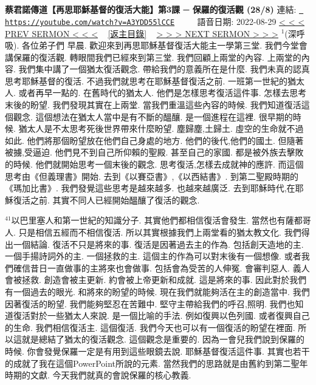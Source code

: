 \documentclass{book}
\begin{document}
\section{}
\label{sec:A3YDD55lCCE}
\textbf{蔡君諾傳道【再思耶穌基督的復活大能】第3課 ─ 保羅的復活觀 (28/8)}
\newline
\newline
連結: \href{https://youtube.com/watch?v=A3YDD55lCCE}{\texttt{ https://youtube.com/watch?v=A3YDD55lCCE}} ~~~~ 語音日期: 2022-08-29 
\newline
\newline
\hyperref[sec:VcMUdsC37SI]{\small{< < < PREV SERMON < < <}}
~
\hyperref[sec:index]{\small{[返主目錄]}}
~
\hyperref[sec:UH_c8ivdgzM]{\small{> > > NEXT SERMON > > >}}
\newline
\newline
$^{1}$(深呼吸).
各位弟子們 早晨.
歡迎來到再思耶穌基督復活大能主一學第三堂.
我們今堂會講保羅的復活觀.
轉眼間我們已經來到第三堂.
我們回顧上兩堂的內容.
上兩堂的內容.
我們集中講了一個猶太復活觀念.
帶給我們的意義所在是什麼.
我們未真的認真思考耶穌基督的復活.
不過我們就思考在耶穌基督復活之前.
一班第一世紀的猶太人.
或者再早一點的.
在舊時代的猶太人.
他們是怎樣思考復活這件事.
怎樣去思考末後的盼望.
我們發現其實在上兩堂.
當我們重溫這些內容的時候.
我們知道復活這個觀念.
這個想法在猶太人當中是有不斷的醞釀.
是一個進程在這裡.
很早期的時候.
猶太人是不太思考死後世界帶來什麼盼望.
塵歸塵,土歸土.
虛空的生命就不過如此.
他們將那個盼望放在他們自己身處的地方.
他們的後代,他們的國土.
但隨著被擄,受逼迫.
他們見不到自己所仰賴的聖殿.
甚至自己的家國.
都是被外族去擊敗的時候.
他們就開始思考一個末後的觀念.
思考復活,怎樣去成就神的應許.
而這個思考由《但義理書》開始.
去到《以賽亞書》,《以西結書》.
到第二聖殿時期的《瑪加比書》.
我們發覺這些思考是越來越多.
也越來越廣泛.
去到耶穌時代,在耶穌復活之前.
其實不同人已經開始醞釀了復活的觀念.

$^{41}$以巴里塞人和第一世紀的知識分子.
其實他們都相信復活會發生.
當然也有薩都哥人.
只是相信五經而不相信復活.
所以其實根據我們上兩堂看的猶太教文化.
我們得出一個結論.
復活不只是將來的事.
復活是因著過去主的作為.
包括創天造地的主.
一個手揚詩詞外的主.
一個拯救的主.
這個主的作為可以對末後有一個想像.
或者我們確信昔日一直做事的主將來也會做事.
包括會為受苦的人伸冤.
會審判惡人.
義人會被拯救.
創造會被主更新.
約會被上帝更新和成就.
這是將來的事.
因此對於我們有一個過去的眼光.
和將來的盼望的時候.
現在我們就能夠活在主的創造當中.
我們因著復活的盼望.
我們能夠堅忍在苦難中.
堅守主帶給我們的呼召,照明.
我們也知道復活對於一些猶太人來說.
是一個比喻的手法.
例如復興以色列國.
或者復興自己的生命.
我們相信復活主.
這個復活.
我們今天也可以有一個復活的盼望在裡面.
所以這就是總結了猶太的復活觀念.
這個觀念是重要的.
因為一會兒我們說到保羅的時候.
你會發覺保羅一定是有用到這些眼鏡去說.
耶穌基督復活這件事.
其實也若干的成就了我在這個PowerPoint所說的元素.
當然我們的思路就是由舊約到第二聖年時期的文獻.
今天我們就真的會說保羅的核心教義.
\end{document}
